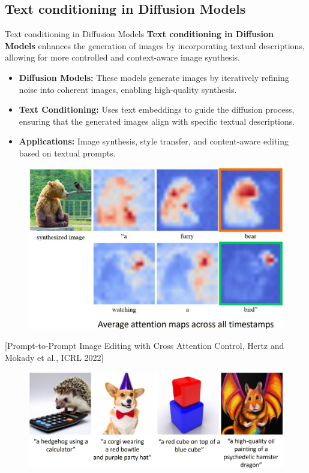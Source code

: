 \subsection{Text conditioning in Diffusion Models}
\begin{frame}[allowframebreaks]{Text conditioning in Diffusion Models}
    \textbf{Text conditioning in Diffusion Models} enhances the generation of images by incorporating textual descriptions, allowing for more controlled and context-aware image synthesis.

    \begin{itemize}
        \item \textbf{Diffusion Models:} These models generate images by iteratively refining noise into coherent images, enabling high-quality synthesis.
        \item \textbf{Text Conditioning:} Uses text embeddings to guide the diffusion process, ensuring that the generated images align with specific textual descriptions.
        \item \textbf{Applications:} Image synthesis, style transfer, and content-aware editing based on textual prompts.
    \end{itemize}
\framebreak
    \begin{figure}
        \centering
        \includegraphics[width=1\textwidth,height=0.8\textheight,keepaspectratio]{images/video/slide_71_1_img.jpg}
    \end{figure}
    {\footnotesize{[Prompt-to-Prompt Image Editing with Cross Attention Control, Hertz and Mokady et al., ICRL 2022]}}
\framebreak
    \begin{figure}
        \centering
        \includegraphics[width=1\textwidth,height=0.9\textheight,keepaspectratio]{images/video/slide_72_1_img.jpg}
    \end{figure}
\end{frame}